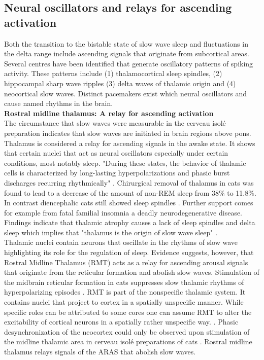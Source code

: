 \subsection{Neural oscillators and relays for ascending activation}
\label{ascending_system_and_oscillators}
Both the transition to the bistable state of slow wave sleep and fluctuations in the delta range include ascending signals that originate from subcortical areas. Several centres have been identified that generate oscillatory patterns of spiking activity. These patterns include (1) thalamocortical sleep spindles, (2) hippocampal sharp wave ripples (3) delta waves of thalamic origin and (4) neocortical slow waves. Distinct pacemakers exist which neural oscillators and cause named rhythms in the brain.\\

\textbf{Rostral midline thalamus: A relay for ascending activation}\\
The circumstance that slow waves were measurable in the cerveau isolé preparation indicates that slow waves are initiated in brain regions above pons. Thalamus is considered a relay for ascending signals in the awake state. It shows that certain nuclei that act as neural oscillators especially under certain conditions, most notably sleep. "During these states, the behavior of thalamic cells is characterized by long-lasting hyperpolarizations and phasic burst discharges recurring rhythmically" \parencite[p. 21]{steriade1984thalamus}. Chirurgical removal of thalamus in cats was found to lead to a decrease of the amount of non-REM sleep from 38\% to 11.8\%. In contrast diencephalic cats still showed sleep spindles \parencite{montagna2005fatal}. Further support comes for example from fatal familial insomnia a deadly neurodegenerative disease. Findings indicate that thalamic atrophy causes a lack of sleep spindles and delta sleep which implies that "thalamus is the origin of slow wave sleep" \parencite[p. 339]{montagna2005fatal}.\\
Thalamic nuclei contain neurons that oscillate in the rhythms of slow wave highlighting its role for the regulation of sleep. Evidence suggests, however, that Rostral Midline Thalamus (RMT) acts as a relay for ascending arousal signals that originate from the reticular formation and abolish slow waves. Stimulation of the midbrain reticular formation in cats suppresses slow thalamic rhythms of hyperpolarizing episodes \parencite{steriade1984thalamus}. RMT is part of the nonspecific thalamic system. It contains nuclei that project to cortex in a spatially unspecific manner. While specific roles can be attributed to some cores one can assume RMT to alter the excitability of cortical neurons in a spatially rather unspecific way. \parencite{vertes2015limbic}. Phasic desynchronization of the neocortex could only be observed upon stimulation of the midline thalamic area in cerveau isolé preparations of cats \parencite{kawamura1968hippocampal}. Rostral midline thalamus relays signals of the ARAS that abolish slow waves.\\

